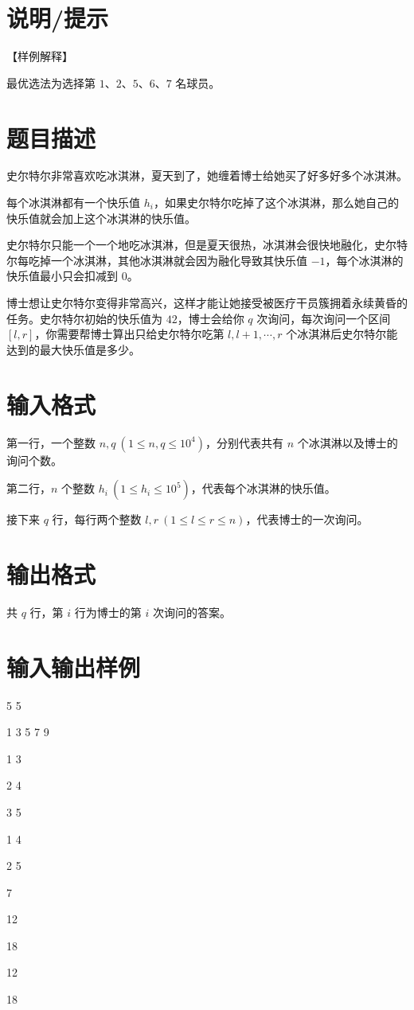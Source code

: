 \documentclass{ctpro}
\begin{document}
\section*{说明/提示}

【样例解释】

最优选法为选择第 $1$、$2$、$5$、$6$、$7$ 名球员。

\makeproblem
\section*{题目描述}

史尔特尔非常喜欢吃冰淇淋，夏天到了，她缠着博士给她买了好多好多个冰淇淋。

每个冰淇淋都有一个快乐值 $h_i$，如果史尔特尔吃掉了这个冰淇淋，那么她自己的快乐值就会加上这个冰淇淋的快乐值。

史尔特尔只能一个一个地吃冰淇淋，但是夏天很热，冰淇淋会很快地融化，史尔特尔每吃掉一个冰淇淋，其他冰淇淋就会因为融化导致其快乐值 $-1$，每个冰淇淋的快乐值最小只会扣减到 $0$。

博士想让史尔特尔变得非常高兴，这样才能让她接受被医疗干员簇拥着永续黄昏的任务。史尔特尔初始的快乐值为 $42$，博士会给你 $q$ 次询问，每次询问一个区间 $[l,r]$，你需要帮博士算出只给史尔特尔吃第 $l,l+1,\cdots,r$ 个冰淇淋后史尔特尔能达到的最大快乐值是多少。

\section*{输入格式}

第一行，一个整数 $n,q~(1 \leq n,q \leq {10}^4)$，分别代表共有 $n$ 个冰淇淋以及博士的询问个数。

第二行，$n$ 个整数 $h_i~(1 \leq h_i \leq {10}^5)$，代表每个冰淇淋的快乐值。

接下来 $q$ 行，每行两个整数 $l,r~(1 \leq l \leq r \leq n)$，代表博士的一次询问。

\section*{输出格式}

共 $q$ 行，第 $i$ 行为博士的第 $i$ 次询问的答案。

\section*{输入输出样例}

\testcasetab
{
    5 5\par
    1 3 5 7 9\par
    1 3\par
    2 4\par
    3 5\par
    1 4\par
    2 5
}
{
    7\par
    12\par
    18\par
    12\par
    18
}
\end{document}
